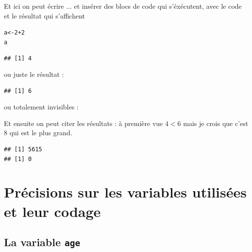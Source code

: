 \documentclass[a4paper, french, 11 pt]{article}\usepackage[]{graphicx}\usepackage[]{xcolor}
\makeatletter
\newcommand{\hlnum}[1]{\textcolor[rgb]{0.686,0.059,0.569}{#1}}%
\newcommand{\hlopt}[1]{\textcolor[rgb]{0,0,0}{#1}}%
\newcommand{\hlstd}[1]{\textcolor[rgb]{0.345,0.345,0.345}{#1}}%
\newcommand{\hlkwb}[1]{\textcolor[rgb]{0.69,0.353,0.396}{#1}}%
\newenvironment{kframe}{%
 \def\at@end@of@kframe{}%
 \ifinner\ifhmode%
  \def\at@end@of@kframe{\end{minipage}}%
  \begin{minipage}{\columnwidth}%
 \fi\fi%
 \def\FrameCommand##1{\hskip\@totalleftmargin \hskip-\fboxsep
 \colorbox{shadecolor}{##1}\hskip-\fboxsep
     \hskip-\linewidth \hskip-\@totalleftmargin \hskip\columnwidth}%
 \MakeFramed {\advance\hsize-\width
   \@totalleftmargin\z@ \linewidth\hsize
   \@setminipage}}%
 {\par\unskip\endMakeFramed%
 \at@end@of@kframe}
\newenvironment{knitrout}{}{} %
\makeatother
\begin{document}
Et ici on peut écrire ... et insérer des blocs de code qui s'éxécutent, avec le code et le résultat qui s'affichent

\begin{knitrout}
\color{fgcolor}\begin{kframe}
\begin{alltt}
\hlstd{a} \hlkwb{<-}  \hlnum{2}\hlopt{+}\hlnum{2}
\hlstd{a}
\end{alltt}
\begin{verbatim}
## [1] 4
\end{verbatim}
\end{kframe}
\end{knitrout}

ou juste le résultat : 

\begin{knitrout}
\color{fgcolor}\begin{kframe}
\begin{verbatim}
## [1] 6
\end{verbatim}
\end{kframe}
\end{knitrout}

ou totalement invisibles : 


Et ensuite on peut citer les résultats : à première vue $4 < 6$ mais je crois que c'est 8 qui est le plus grand.





\begin{knitrout}
\color{fgcolor}\begin{kframe}
\begin{verbatim}
## [1] 5615
## [1] 0
\end{verbatim}
\end{kframe}
\end{knitrout}



\printbibliography

\appendix
\appendixpage
\addappheadtotoc

\section{Précisions sur les variables utilisées et leur codage}

\subsection{La variable \texttt{age}}
\end{document}
